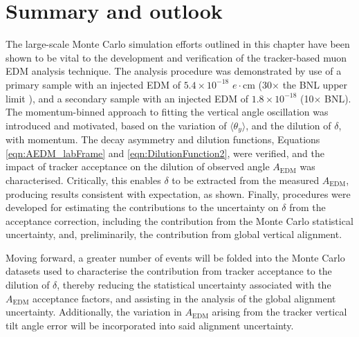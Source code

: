 \section{Summary and outlook}



The large-scale Monte Carlo simulation efforts outlined in this chapter have been shown to be vital to the development and verification of the tracker-based muon EDM analysis technique. The analysis procedure was demonstrated by use of a primary sample with an injected EDM of $5.4\times10^{-18}$ $e\cdot$cm (30$\times$ the BNL upper limit \cite{BNLEDM}), and a secondary sample with an injected EDM of $1.8\times10^{-18}$ (10$\times$ BNL). The momentum-binned approach to fitting the vertical angle oscillation was introduced and motivated, based on the variation of $\langle \theta_{y} \rangle$, and the dilution of $\delta$, with momentum. The decay asymmetry and dilution functions, Equations \ref{eqn:AEDM_labFrame} and \ref{eqn:DilutionFunction2}, were verified, and the impact of tracker acceptance on the dilution of observed angle $A_{\text{EDM}}$ was characterised. Critically, this enables $\delta$ to be extracted from the measured $A_{\text{EDM}}$, producing results consistent with expectation, as shown. Finally, procedures were developed for estimating the contributions to the uncertainty on $\delta$ from the acceptance correction, including the contribution from the Monte Carlo statistical uncertainty, and, preliminarily, the contribution from global vertical alignment. 

Moving forward, a greater number of events will be folded into the Monte Carlo datasets used to characterise the contribution from tracker acceptance to the dilution of $\delta$, thereby reducing the statistical uncertainty associated with the $A_{\text{EDM}}$ acceptance factors, and assisting in the analysis of the global alignment uncertainty. Additionally, the variation in $A_{\text{EDM}}$ arising from the tracker vertical tilt angle error will be incorporated into said alignment uncertainty.
